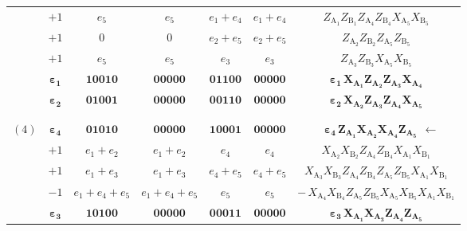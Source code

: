 \documentclass[journal,onecolumn]{IEEEtran}
\begin{document}
\begin{table}
\begin{tabularx}{.8\linewidth}{c c || *{2}{C} | *{2}{C} || c}
     & $+1$ &    $e_5$ & $e_5$   &   $e_1+e_4$ & $e_1+e_4$    & $Z_{\text{A}_1} Z_{\text{B}_1} Z_{\text{A}_4} Z_{\text{B}_4} X_{\text{A}_5} X_{\text{B}_5}$ \\
     & $+1$ &    $0$ & $0$   &   $e_2+e_5$ & $e_2+e_5$    & $Z_{\text{A}_2} Z_{\text{B}_2} Z_{\text{A}_5} Z_{\text{B}_5}$ \\
     & $+1$ &    $e_5$ & $e_5$   &   $e_3$ & $e_3$    & $Z_{\text{A}_3} Z_{\text{B}_3} X_{\text{A}_5} X_{\text{B}_5}$ \\
     & $\boldsymbol{ \varepsilon_1 }$ &    $\boldsymbol{ 10010 }$ & $\boldsymbol{ 00000 }$   &   $\boldsymbol{ 01100 }$ & $\boldsymbol{ 00000 }$    & $\boldsymbol{ \varepsilon_1 \, X_{\text{A}_1} Z_{\text{A}_2} Z_{\text{A}_3} X_{\text{A}_4} }$ \\
     & $\boldsymbol{ \varepsilon_2 }$ &    $\boldsymbol{ 01001 }$ & $\boldsymbol{ 00000 }$   &   $\boldsymbol{ 00110 }$ & $\boldsymbol{ 00000 }$    & $\boldsymbol{ \varepsilon_2 \, X_{\text{A}_2} Z_{\text{A}_3} Z_{\text{A}_4} X_{\text{A}_5} }$ \\
%
     &     &        &       &         &          &                   \\
%
\midrule
%
     &     &        &       &         &          &                   \\
%
$(4)$ & $\boldsymbol{ \varepsilon_4 }$ &    $\boldsymbol{ 01010 }$ & $\boldsymbol{ 00000 }$   &   $\boldsymbol{ 10001 }$ & $\boldsymbol{ 00000 }$    & \qquad \ \  $\boldsymbol{ \varepsilon_4 \, Z_{\text{A}_1} X_{\text{A}_2} X_{\text{A}_4} Z_{\text{A}_5} } \ \ \boldsymbol{\longleftarrow}$ \\
     & $+1$ &    $e_1+e_2$ & $e_1+e_2$   &   $e_4$ & $e_4$    & $X_{\text{A}_2} X_{\text{B}_2} Z_{\text{A}_4} Z_{\text{B}_4} X_{\text{A}_1} X_{\text{B}_1}$ \\
     & $+1$ &    $e_1+e_3$ & $e_1+e_3$   &   $e_4+e_5$ & $e_4+e_5$    & $X_{\text{A}_3} X_{\text{B}_3} Z_{\text{A}_4} Z_{\text{B}_4} Z_{\text{A}_5} Z_{\text{B}_5} X_{\text{A}_1} X_{\text{B}_1}$ \\
     & $-1$ &    $e_1+e_4+e_5$ & $e_1+e_4+e_5$   &   $e_5$ & $e_5$    & $- \, X_{\text{A}_4} X_{\text{B}_4} Z_{\text{A}_5} Z_{\text{B}_5} X_{\text{A}_5} X_{\text{B}_5} X_{\text{A}_1} X_{\text{B}_1}$ \\
     & $\boldsymbol{ \varepsilon_3 }$ &    $\boldsymbol{ 10100 }$ & $\boldsymbol{ 00000 }$   &   $\boldsymbol{ 00011 }$ & $\boldsymbol{ 00000 }$    & $\boldsymbol{ \varepsilon_3 \, X_{\text{A}_1} X_{\text{A}_3} Z_{\text{A}_4} Z_{\text{A}_5} }$ \\

\end{tabularx}
\end{table}
\end{document}
